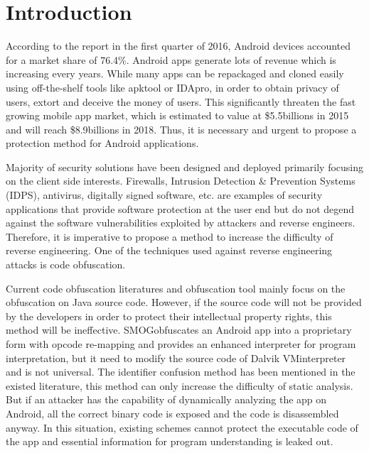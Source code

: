 \section{Introduction}
According to the report in the first quarter of 2016, Android devices accounted for a market share of 76.4\%\cite{01}. Android apps generate lots of revenue which is increasing every years. While many apps can be repackaged and cloned easily using off-the-shelf tools like apktool\cite{33} or IDApro\cite{34}, in order to obtain privacy of users, extort and deceive the money of users. This significantly threaten the fast growing mobile app market, which is estimated to value at \$5.5billions in 2015 and will reach \$8.9billions in 2018\cite{02}. Thus, it is necessary and urgent to propose a protection method for Android applications.

Majority of security solutions have been designed and deployed primarily focusing on the client side interests. Firewalls\cite{28,29}, Intrusion Detection \& Prevention Systems (IDPS)\cite{30,31}, antivirus\cite{32}, digitally signed software, etc. are examples of security applications that provide software protection at the user end but do not degend against the software vulnerabilities exploited by attackers and reverse engineers. Therefore, it is imperative to propose a method to increase the difficulty of reverse engineering. One of the techniques used against reverse engineering attacks is code obfuscation\cite{05}.

Current code obfuscation literatures\cite{06,07,08} and obfuscation tool\cite{09} mainly focus on the obfuscation on Java source code. However, if the source code will not be provided by the developers in order to protect their intellectual property rights, this method will be ineffective. SMOG\cite{10}obfuscates an Android app into a proprietary form with opcode re-mapping and provides an enhanced interpreter for program interpretation, but it need to modify the source code of Dalvik VM\cite{19}interpreter and is not universal. The identifier confusion method has been mentioned in the existed literature\cite{11}, this method can only increase the difficulty of static analysis. But if an attacker has the capability of dynamically analyzing the app on Android, all the correct binary code is exposed and the code is disassembled anyway. In this situation, existing schemes cannot protect the executable code of the app and essential information for program understanding is leaked out.



